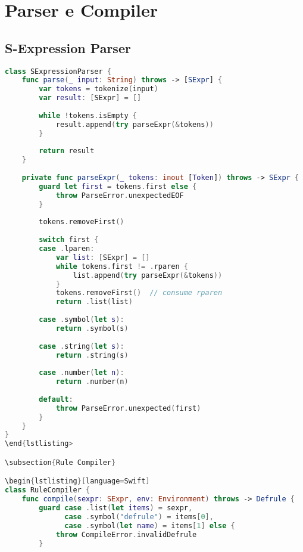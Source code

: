 \section{Parser e Compiler}

\subsection{S-Expression Parser}

\begin{lstlisting}[language=Swift]
class SExpressionParser {
    func parse(_ input: String) throws -> [SExpr] {
        var tokens = tokenize(input)
        var result: [SExpr] = []
        
        while !tokens.isEmpty {
            result.append(try parseExpr(&tokens))
        }
        
        return result
    }
    
    private func parseExpr(_ tokens: inout [Token]) throws -> SExpr {
        guard let first = tokens.first else {
            throw ParseError.unexpectedEOF
        }
        
        tokens.removeFirst()
        
        switch first {
        case .lparen:
            var list: [SExpr] = []
            while tokens.first != .rparen {
                list.append(try parseExpr(&tokens))
            }
            tokens.removeFirst()  // consume rparen
            return .list(list)
            
        case .symbol(let s):
            return .symbol(s)
            
        case .string(let s):
            return .string(s)
            
        case .number(let n):
            return .number(n)
            
        default:
            throw ParseError.unexpected(first)
        }
    }
}
\end{lstlisting>

\subsection{Rule Compiler}

\begin{lstlisting}[language=Swift]
class RuleCompiler {
    func compile(sexpr: SExpr, env: Environment) throws -> Defrule {
        guard case .list(let items) = sexpr,
              case .symbol("defrule") = items[0],
              case .symbol(let name) = items[1] else {
            throw CompileError.invalidDefrule
        }
        

\end{lstlisting}
